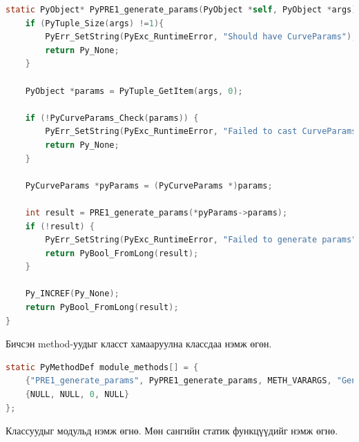 \begin{lstlisting}[language=C, caption={Method-ууд}, captionpos=b]
static PyObject* PyPRE1_generate_params(PyObject *self, PyObject *args) {
    if (PyTuple_Size(args) !=1){
        PyErr_SetString(PyExc_RuntimeError, "Should have CurveParams");
        return Py_None;
    }

    PyObject *params = PyTuple_GetItem(args, 0);

    if (!PyCurveParams_Check(params)) {
        PyErr_SetString(PyExc_RuntimeError, "Failed to cast CurveParams");
        return Py_None;
    }

    PyCurveParams *pyParams = (PyCurveParams *)params;

    int result = PRE1_generate_params(*pyParams->params);
    if (!result) {
        PyErr_SetString(PyExc_RuntimeError, "Failed to generate params");
        return PyBool_FromLong(result);
    }

    Py_INCREF(Py_None);
    return PyBool_FromLong(result);
}
\end{lstlisting}

\noindent Бичсэн method-уудыг класст хамааруулна классдаа нэмж өгөн.

\begin{lstlisting}[language=C, caption={Method-уудыг класст хамааруулна.}, captionpos=b]
static PyMethodDef module_methods[] = {
    {"PRE1_generate_params", PyPRE1_generate_params, METH_VARARGS, "Generate curve parameters for the PRE1 scheme."},
    {NULL, NULL, 0, NULL}
};
\end{lstlisting}
\noindent Классуудыг модульд нэмж өгнө. Мөн сангийн статик функцүүдийг нэмж өгнө.


